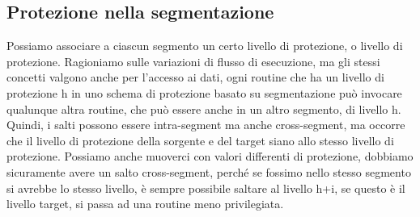 \documentclass[12pt, oneside]{extbook}
\begin{document}
\subsection{Protezione nella segmentazione}
Possiamo associare a ciascun segmento un certo livello di protezione, o livello di protezione. Ragioniamo sulle variazioni di flusso di esecuzione, ma gli stessi concetti valgono anche per l'accesso ai dati, ogni routine che ha un livello di protezione h in uno schema di protezione basato su segmentazione può invocare qualunque altra routine, che può essere anche in un altro segmento, di livello h. Quindi, i salti possono essere intra-segment ma anche cross-segment, ma occorre che il livello di protezione della sorgente e del target siano allo stesso livello di protezione. Possiamo anche muoverci con valori differenti di protezione, dobbiamo sicuramente avere un salto cross-segment, perché se fossimo nello stesso segmento si avrebbe lo stesso livello, è sempre possibile saltare al livello h+i, se questo è il livello target, si passa ad una routine meno privilegiata.
\end{document}
